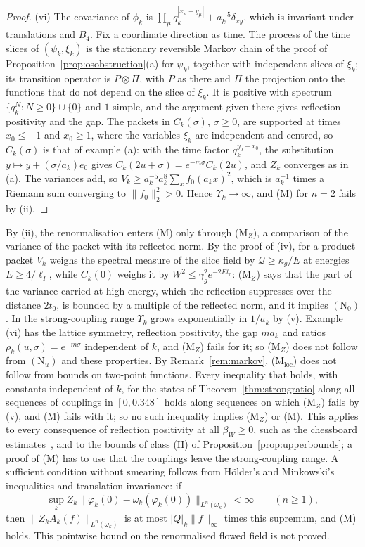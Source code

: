 \documentclass[aps,prd,twocolumn,superscriptaddress,nofootinbib,longbibliography,floatfix,amsmath,amssymb,10pt]{revtex4-2}
\theoremstyle{definition}
\theoremstyle{remark}
\begin{document}
\begin{proof}
(vi) The covariance of $\phi_k$ is $\prod_\mu q_k^{|x_\mu-y_\mu|}+
a_k^{-5}\delta_{xy}$, which is invariant under translations and $B_4$.
Fix a coordinate direction as time. The process of the time slices of
$(\psi_k,\xi_k)$ is the stationary reversible Markov chain of the proof
of Proposition~\ref{prop:osobstruction}(a) for $\psi_k$, together with
independent slices of $\xi_k$; its transition operator is $P\otimes\Pi$,
with $P$ as there and $\Pi$ the projection onto the functions that do not
depend on the slice of $\xi_k$. It is positive with spectrum
$\{q_k^N:N\ge0\}\cup\{0\}$ and $1$ simple, and the argument given there
gives reflection positivity and the gap. The packets in $C_k(\sigma)$,
$\sigma\ge0$, are supported at times $x_0\le-1$ and $x_0\ge1$, where
the variables $\xi_k$ are independent and centred, so $C_k(\sigma)$ is
that of example (a): with the time factor $q_k^{y_0-x_0}$, the
substitution $y\mapsto y+(\sigma/a_k)e_0$ gives $C_k(2u+\sigma)=
e^{-m\sigma}C_k(2u)$, and $Z_k$ converges as in (a). The variances add,
so $V_k\ge a_k^{-5}a_k^8\sum_xf_0(a_kx)^2$, which is $a_k^{-1}$ times a
Riemann sum converging to $\|f_0\|_2^2>0$. Hence $\Upsilon_k\to\infty$,
and (M) for $n=2$ fails by (ii).
\end{proof}

By (ii), the renormalisation enters (M) only through (M$_Z$), a comparison
of the variance of the packet with its reflected norm. By the proof of
(iv), for a product packet $V_k$ weighs the spectral measure of the slice
field by $\mathcal Q\ge\kappa_g/E$ at energies $E\ge4/\ell_I$, while
$C_k(0)$ weighs it by $W^2\le\gamma_g^2e^{-2Et_0}$: (M$_Z$) says that the
part of the variance carried at high energy, which the reflection
suppresses over the distance $2t_0$, is bounded by a multiple of the
reflected norm, and it implies $(\mathrm N_0)$. In the strong-coupling
range $\Upsilon_k$ grows exponentially in $1/a_k$ by (v). Example (vi) has
the lattice symmetry, reflection positivity, the gap $ma_k$ and ratios
$\rho_k(u,\sigma)=e^{-m\sigma}$ independent of $k$, and (M$_Z$) fails for
it; so (M$_Z$) does not follow from $(\mathrm N_u)$ and these properties.
By Remark~\ref{rem:markov}, (M$_{\mathrm{loc}}$) does not follow from
bounds on two-point functions. Every inequality that holds, with
constants independent of $k$, for the states of
Theorem~\ref{thm:strongratio} along all sequences of couplings in
$[0,0.348]$ holds along sequences on which (M$_Z$) fails by (v), and (M)
fails with it; so no such inequality implies (M$_Z$) or (M). This applies
to every consequence of reflection positivity at all $\beta_W\ge0$, such
as the chessboard estimates~\cite{FILS78}, and to the bounds of class (H)
of Proposition~\ref{prop:upperbounds}; a proof of (M) has to use that the
couplings leave the strong-coupling range. A sufficient condition without smearing
follows from H\"older's and Minkowski's inequalities and translation
invariance: if
\[
\sup_kZ_k\bigl\|\varphi_k(0)-\omega_k(\varphi_k(0))\bigr\|_{L^n(\omega_k)}
<\infty\qquad(n\ge1),
\]
then $\|Z_kA_k(f)\|_{L^n(\omega_k)}$ is at most $|Q|_k\|f\|_\infty$ times
this supremum, and (M) holds. This pointwise bound on the renormalised
flowed field is not proved.
\end{document}
